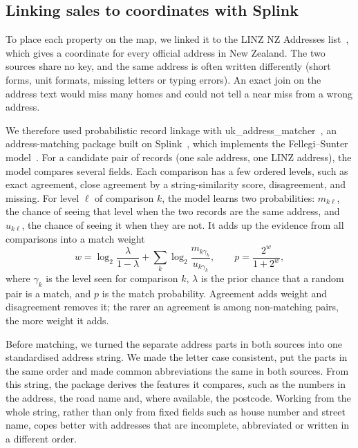 \documentclass[conference]{IEEEtran}
\begin{document}
\subsection{Linking sales to coordinates with Splink}\label{sec:linkage}
To place each property on the map, we linked it to the LINZ NZ
Addresses list~\cite{linz_addresses}, which gives a coordinate for every
official address in New Zealand. The two sources share no key, and the
same address is often written differently (short forms, unit formats,
missing letters or typing errors). An exact join on the address text
would miss many homes and could not tell a near miss from a wrong
address.

We therefore used probabilistic record linkage with
uk\_address\_matcher~\cite{uam_docs}, an address-matching
package built on Splink~\cite{linacre2022,splink_docs}, which implements
the Fellegi--Sunter model~\cite{fellegi1969}. For a candidate pair of records
(one sale address, one LINZ address), the model compares several fields.
Each comparison has a few ordered levels, such as exact agreement, close
agreement by a string-similarity score, disagreement, and missing. For
level $\ell$ of comparison $k$, the model learns two probabilities:
$m_{k\ell}$, the chance of seeing that level when the two records are
the same address, and $u_{k\ell}$, the chance of seeing it when they are
not. It adds up the evidence from all comparisons into a match weight
\begin{equation}
  w = \log_2\frac{\lambda}{1-\lambda}
      + \sum_{k}\log_2\frac{m_{k\gamma_k}}{u_{k\gamma_k}},
  \qquad
  p = \frac{2^{w}}{1+2^{w}},
  \label{eq:linkage}
\end{equation}
where $\gamma_k$ is the level seen for comparison $k$, $\lambda$ is the
prior chance that a random pair is a match, and $p$ is the match
probability. Agreement adds weight and disagreement removes it; the
rarer an agreement is among non-matching pairs, the more weight it adds.

Before matching, we turned the separate address parts in both sources
into one standardised address string. We made the letter case
consistent, put the parts in the same order and made common
abbreviations the same in both sources. From this string, the package
derives the features it compares, such as the numbers in the address,
the road name and, where available, the postcode. Working from the whole
string, rather than only from fixed fields such as house number and
street name, copes better with addresses that are incomplete,
abbreviated or written in a different order.
\end{document}
